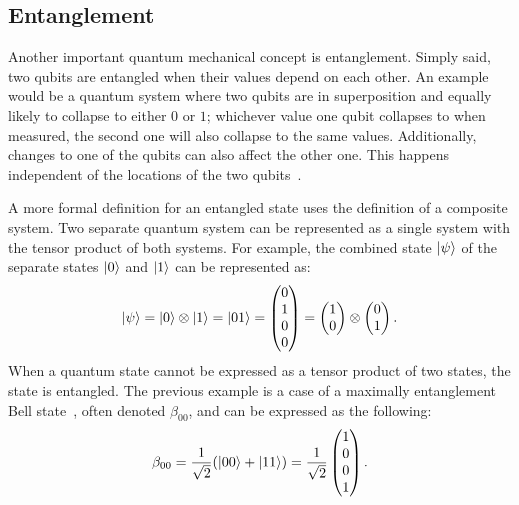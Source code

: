 \subsection{Entanglement}
\label{sec:background_entanglement}
Another important quantum mechanical concept is entanglement. Simply said, two qubits are entangled when their values depend on each other. An example would be a quantum system where two qubits are in superposition and equally likely to collapse to either $0$ or $1$; whichever value one qubit collapses to when measured, the second one will also collapse to the same values.
Additionally, changes to one of the qubits can also affect the other one. This happens independent of the locations of the two qubits~\cite{RDB*22, HHHH09}.

A more formal definition for an entangled state uses the definition of a composite system. Two separate quantum system can be represented as a single system with the tensor product of both systems. For example, the combined state $\ket{\psi}$ of the separate states $\ket{0}$ and $\ket{1}$ can be represented as:
\begin{equation*}
    \ket{\psi} 
    = \ket{0} \otimes \ket{1} 
    = \ket{01} 
    = \begin{pmatrix}
        0 \\    
        1 \\    
        0 \\    
        0     
    \end{pmatrix}
    = \begin{pmatrix}
        1 \\ 0
    \end{pmatrix} \otimes 
    \begin{pmatrix}
        0 \\ 1
    \end{pmatrix}.
\end{equation*} 
When a quantum state cannot be expressed as a tensor product of two states, the state is entangled. The previous example is a case of a maximally entanglement Bell state~\cite{DiCh20a, MHH19}, often denoted $\beta_{00}$, and can be expressed as the following:
\begin{equation*}
    \beta_{00} = \frac{1}{\sqrt{2}} (\ket{00} + \ket{11}) = \frac{1}{\sqrt{2}} 
    \begin{pmatrix}
        1 \\
        0 \\
        0 \\
        1    
    \end{pmatrix}.
\end{equation*}


